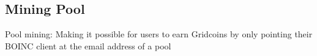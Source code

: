 \subsection{Mining Pool}

Pool mining: Making it possible for users to earn Gridcoins by only pointing their BOINC client at the email address of a pool


